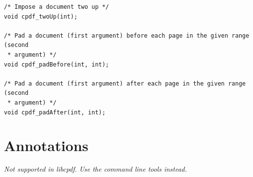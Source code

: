 \documentclass[a4paper]{memoir}
\begin{document}
\begin{small}
\begin{lstlisting}
/* Impose a document two up */
void cpdf_twoUp(int);

/* Pad a document (first argument) before each page in the given range (second
 * argument) */
void cpdf_padBefore(int, int);

/* Pad a document (first argument) after each page in the given range (second
 * argument) */
void cpdf_padAfter(int, int);
\end{lstlisting}
\end{small}

\chapter{Annotations}
\textit{Not supported in libcpdf. Use the command line tools instead.}
\end{document}
